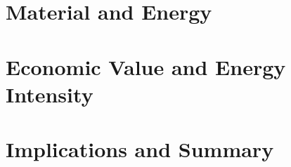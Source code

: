 \documentclass[graybox,envcountchap,sectrefs]{svmono}
\begin{document}





\part{Material and Energy}
\label{part:matter}







\part{Economic Value and Energy Intensity}
\label{part:values}

 

 

\part{Implications and Summary}
\label{part:implications}








\begin{appendices}
	
	

	

	

	

	

\end{appendices}
\end{document}
